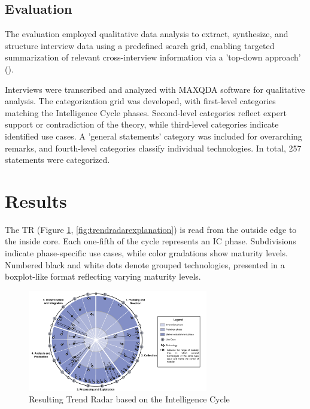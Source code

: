 \documentclass[10pt]{article}
\begin{document}
\subsection{Evaluation} \label{sec:eval}

The evaluation employed qualitative data analysis to extract, synthesize, and structure interview data using a predefined search grid, enabling targeted summarization of relevant cross-interview information via a 'top-down approach' (\cite{Bogner.2014}).

Interviews were transcribed and analyzed with MAXQDA software for qualitative analysis. The categorization grid was developed, with first-level categories matching the Intelligence Cycle phases. Second-level categories reflect expert support or contradiction of the theory, while third-level categories indicate identified use cases. A 'general statements' category was included for overarching remarks, and fourth-level categories classify individual technologies. In total, 257 statements were categorized.

\section{Results} \label{sec:results}

The TR (Figure \ref{fig:trendradar}, \ref{fig:trendradarexplanation}) is read from the outside edge to the inside core.
Each one-fifth of the cycle represents an IC phase. Subdivisions indicate
phase-specific use cases, while color gradations show maturity levels. Numbered black
and white dots denote grouped technologies, presented in a boxplot-like format reflecting
varying maturity levels.

\begin{figure}[thb]
    \centering
    \includegraphics[width=0.7\textwidth]{PDF/images/crop_Trendradar}
    \caption{Resulting Trend Radar based on the Intelligence Cycle}
    \label{fig:trendradar}
\end{figure}
\end{document}

